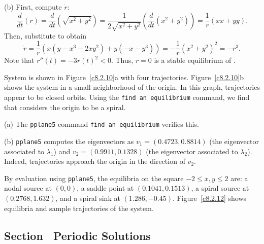 (b) First, compute $\dot{r}$:
\[
\frac{d}{dt}(r) = \frac{d}{dt}(\sqrt{x^2 + y^2}) =
\frac{1}{2\sqrt{x^2 + y^2}}\left(\frac{d}{dt}(x^2 + y^2)\right)
= \frac{1}{r}(x\dot{x} + y\dot{y}).
\]
Then, substitute  to obtain
\[
\dot{r} = \frac{1}{r}(x(y - x^3 - 2xy^2) + y(-x - y^3))
= -\frac{1}{r}(x^2 + y^2)^2 = -r^3.
\]
Note that $r''(t) = -3r(t)^2 < 0$.  Thus, $r = 0$ is a stable equilibrium
of .

System  is shown in Figure~\ref{c8.2.10}a with four
trajectories.  Figure~\ref{c8.2.10}b shows the system in a small
neighborhood of the origin.  In this graph, trajectories appear to be
closed orbits.  Using the {\tt find an equilibrium} command, we find
that \Matlab considers the origin to be a spiral.

\begin{figure}[htb]
                       \centerline{%
                       }
\end{figure}

(a) The {\tt pplane5} command {\tt find an equilibrium} verifies this.

(b) {\tt pplane5} computes the eigenvectors as $v_1 = (0.4723,0.8814)$
(the eigenvector associated to $\lambda_1$) and $v_2 =
(0.9911,0.1328)$ (the eigenvector associated to $\lambda_2$).
Indeed, trajectories approach the origin in the direction of $v_2$.

By evaluation using {\tt pplane5}, the equilibria on the square
$-2 \leq x,y \leq 2$ are: a nodal source at $(0,0)$, a saddle point
at $(0.1041, 0.1513)$, a spiral source at $(0.2768,1.632)$, and a
spiral sink at $(1.286,-0.45)$.  Figure~\ref{c8.2.12} shows
equilibria and sample trajectories of the system.

\begin{figure}[htb]
                       \centerline{%
                       }
\end{figure}

\subsection*{Section~\protect{\ref{S:periodic}} Periodic Solutions}

